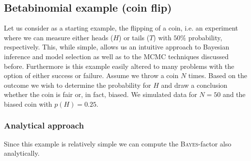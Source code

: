 \documentclass[%
 reprint,
 amsmath,amssymb,
 aps,
]{revtex4-1}
\begin{document}
\subsection{Betabinomial example (coin flip)}
Let us consider as a starting example, the flipping of a coin, i.e. an experiment where we can measure either heads ($H$) or tails ($T$) with $50\%$ probability, respectively. This, while simple, allows us an intuitive approach to Bayesian inference and model selection as well as to the MCMC techniques discussed before. Furthermore is this example easily altered to many problems with the option of either success or failure. Assume we throw a coin $N$ times.  Based on the outcome we wish to determine the probability for $H$ and draw a conclusion whether the coin is fair or, in fact, biased. We simulated data for $N=50$ and the biased coin with $p(H)=0.25$.
\subsubsection{Analytical approach}
Since this example is relatively simple we can compute the \textsc{Bayes}-factor also analytically.
\end{document}
